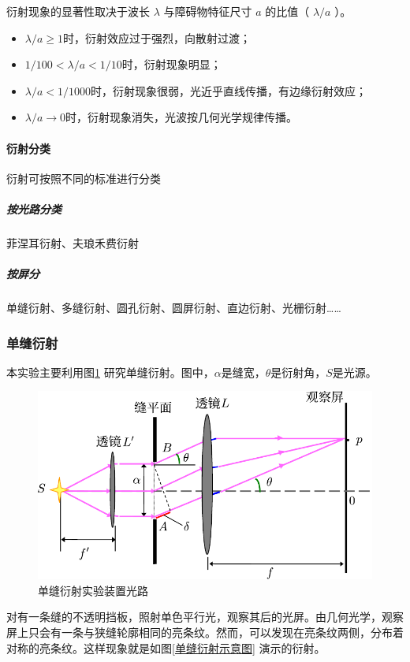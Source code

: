 \documentclass[a4paper]{../phyreport}
\begin{document}
衍射现象的显著性取决于波长 $\lambda$ 与障碍物特征尺寸 $a$ 的比值（ $\lambda/a$ ）。

\begin{itemize}
  \item $\lambda/a\ge 1$时，衍射效应过于强烈，向散射过渡；
  \item $1/100 < \lambda/a < 1/10$时，衍射现象明显；
  \item $\lambda/a < 1/1000$时，衍射现象很弱，光近乎直线传播，有边缘衍射效应；
  \item $\lambda/a \to 0$时，衍射现象消失，光波按几何光学规律传播。
\end{itemize}

\paragraph{衍射分类}
衍射可按照不同的标准进行分类
\subparagraph{按光路分类} 菲涅耳衍射、夫琅禾费衍射

\subparagraph{按屏分}
单缝衍射、多缝衍射、圆孔衍射、圆屏衍射、直边衍射、光栅衍射……

\subsubsection{单缝衍射}

本实验主要利用图\ref{装置光路} 研究单缝衍射。图中，$\alpha$是缝宽，$\theta$是衍射角，$S$是光源。

\begin{figure}[H]
  \centering
  \includegraphics[scale=0.65]{fig/装置光路.pdf}
  \caption{单缝衍射实验装置光路} \label{装置光路}
\end{figure}

对有一条缝的不透明挡板，照射单色平行光，观察其后的光屏。由几何光学，观察屏上只会有一条与狭缝轮廓相同的亮条纹。然而，可以发现在亮条纹两侧，分布着对称的亮条纹。这样现象就是如图\ref{单缝衍射示意图} 演示的衍射。
\end{document}

